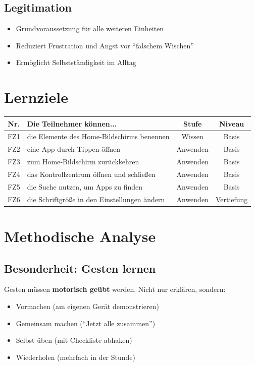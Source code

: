 \documentclass[11pt,a4paper]{article}
\begin{document}
\subsection{Legitimation}
\begin{itemize}
    \item Grundvoraussetzung für alle weiteren Einheiten
    \item Reduziert Frustration und Angst vor ``falschem Wischen''
    \item Ermöglicht Selbstständigkeit im Alltag
\end{itemize}

\section{Lernziele}

\begin{tabular}{|c|p{7cm}|c|c|}
\hline
\textbf{Nr.} & \textbf{Die Teilnehmer können...} & \textbf{Stufe} & \textbf{Niveau} \\
\hline
FZ1 & die Elemente des Home-Bildschirms benennen & Wissen & Basis \\
FZ2 & eine App durch Tippen öffnen & Anwenden & Basis \\
FZ3 & zum Home-Bildschirm zurückkehren & Anwenden & Basis \\
FZ4 & das Kontrollzentrum öffnen und schließen & Anwenden & Basis \\
FZ5 & die Suche nutzen, um Apps zu finden & Anwenden & Basis \\
FZ6 & die Schriftgröße in den Einstellungen ändern & Anwenden & Vertiefung \\
\hline
\end{tabular}

\section{Methodische Analyse}

\subsection{Besonderheit: Gesten lernen}
Gesten müssen \textbf{motorisch geübt} werden. Nicht nur erklären, sondern:
\begin{itemize}
    \item Vormachen (am eigenen Gerät demonstrieren)
    \item Gemeinsam machen (``Jetzt alle zusammen'')
    \item Selbst üben (mit Checkliste abhaken)
    \item Wiederholen (mehrfach in der Stunde)
\end{itemize}
\end{document}
